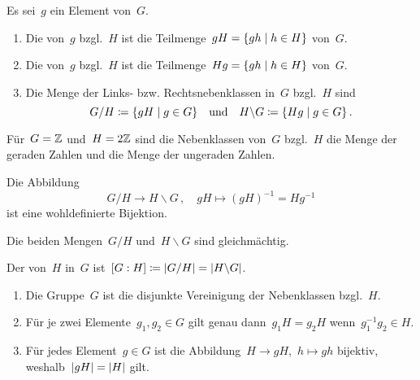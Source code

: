 \begin{definition}
  Es sei~$g$ ein Element von~$G$.
  \begin{enumerate}
    \item
      Die  von~$g$ bzgl.~$H$ ist die Teilmenge~$gH = \{ gh \suchthat h \in H \}$ von~$G$.
    \item
      Die  von~$g$ bzgl.~$H$ ist die Teilmenge~$Hg = \{ gh \suchthat h \in H \}$ von~$G$.
    \item
      Die Menge der Links- bzw. Rechtsnebenklassen in~$G$ bzgl.~$H$ sind
      \[
        G/H \defined \{ gH \suchthat g \in G \}
        \quad\text{und}\quad
        H \backslash G \defined \{ Hg \suchthat g \in G \} \,.
      \]
  \end{enumerate}
\end{definition}

\begin{example}
  Für~$G = \mathbb{Z}$ und~$H = 2 \mathbb{Z}$ sind die Nebenklassen von~$G$ bzgl.~$H$ die Menge der geraden Zahlen und die Menge der ungeraden Zahlen.
\end{example}

\begin{proposition}
  Die Abbildung
  \[
    G/H
    \to
    H \backslash G \,,
    \quad
    gH
    \mapsto
    (gH)^{-1}
    =
    Hg^{-1}
  \]
  ist eine wohldefinierte Bijektion.
\end{proposition}

\begin{corollary}
  Die beiden Mengen~$G/H$ und~$H \backslash G$ sind gleichmächtig.
\end{corollary}

\begin{definition}
  Der  von~$H$ in~$G$ ist~$[G : H] \coloneqq \lvert G/H \rvert = \lvert H \backslash G \rvert$.
\end{definition}

\begin{proposition}
  \leavevmode
  \begin{enumerate}
    \item
      Die Gruppe~$G$ ist die disjunkte Vereinigung der Nebenklassen bzgl.~$H$.
    \item
      Für je zwei Elemente~$g_1, g_2 \in G$ gilt genau dann~$g_1 H = g_2 H$ wenn~$g_1^{-1} g_2 \in H$.
    \item
      Für jedes Element~$g \in G$ ist die Abbildung~$H \to gH$,~$h \mapsto gh$ bijektiv, weshalb~$\lvert gH\rvert = \lvert H\rvert$ gilt.
  \end{enumerate}
\end{proposition}

